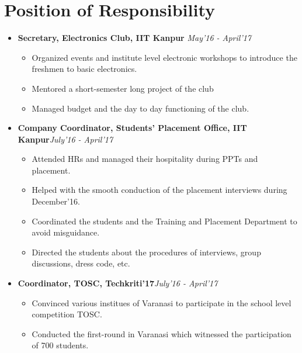 \documentclass[10pt]{scrbook}
\begin{document}
\section*{Position of Responsibility}
\begin{itemize}
\item \textbf{Secretary, Electronics Club, IIT Kanpur} \hfill\textit{May'16 - April'17}
\begin{itemize}
\item Organized events and institute level electronic workshops to introduce the freshmen  to basic electronics. 
\item Mentored a short-semester long project of the club
\item Managed budget and the day to day functioning of the club.
\end{itemize}
\item \textbf{Company Coordinator, Students' Placement Office, IIT Kanpur}\hfill\textit{July'16 - April'17}
\begin{itemize}
\item Attended HRs and managed their hospitality during PPTs and placement.
\item Helped with the smooth conduction of the placement interviews during December'16.
\item Coordinated the students and the Training and Placement Department to avoid misguidance.
\item Directed the students about the procedures of interviews, group discussions, dress code, etc.
\end{itemize}
\item \textbf{Coordinator, TOSC, Techkriti'17}\hfill\textit{July'16 - April'17}
\begin{itemize}
\item Convinced various institues of Varanasi to participate in the school level competition TOSC.
\item Conducted the first-round in Varanasi which witnessed the participation of 700 students.
\end{itemize}

\end{itemize}
\end{document}
